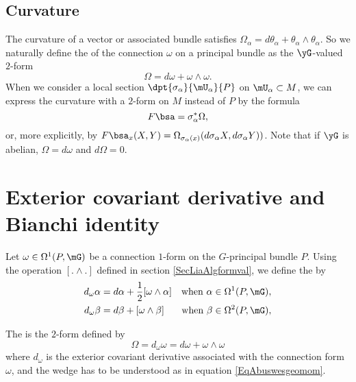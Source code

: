 \subsection{Curvature}

The curvature of a vector or associated bundle satisfies $\Omega_{\alpha}=d\theta_{\alpha}+\theta_{\alpha}\wedge\theta_{\alpha}$. So we naturally define the  of the connection $\omega$ on a principal bundle as the $\yG$-valued $2$-form
\begin{equation} 
  \Omega=d\omega+\omega\wedge\omega.
\end{equation}
When we consider a local section\label{PgLocSecCurv} $\dpt{\sigma_{\alpha}}{\mU_{\alpha}}{P}$ on $\mU_{\alpha}\subset M$, we can express the curvature with a $2$-form on $M$ instead of $P$ by the formula \label{pg:curv_princ}
\[ 
 F\bsa=\sigma_{\alpha}^*\Omega,
\]
or, more explicitly, by $F\bsa_x(X,Y)=\Omega_{\sigma_{\alpha}(x)}(d\sigma_{\alpha} X,d\sigma_{\alpha} Y))$. Note that if $\yG$ is abelian, $\Omega=d\omega$ and $d\Omega=0$.

\section{Exterior covariant derivative and Bianchi identity} 

Let $\omega\in\Omega^1(P,\mG)$ be a connection $1$-form on the $G$-principal bundle $P$. Using the operation $[.\wedge .]$ defined in section \ref{SecLiaAlgformval}, we define the  by  %
\begin{align}
d_{\omega}\alpha&=d\alpha+\frac{ 1 }{2}[\omega\wedge\alpha]&\text{when }\alpha\in\Omega^1(P,\mG),\\
d_{\omega}\beta&=d\beta+[\omega\wedge\beta]&\text{when }\beta\in\Omega^2(P,\mG),
\end{align}

The  is the $2$-form defined by
\begin{equation}
\Omega=d_{\omega}\omega=d\omega+\omega\wedge\omega
\end{equation}
where $d_{\omega}$ is the exterior covariant derivative associated with the connection form $\omega$, and the wedge has to be understood as in equation \eqref{EqAbuswesgeomom}.

